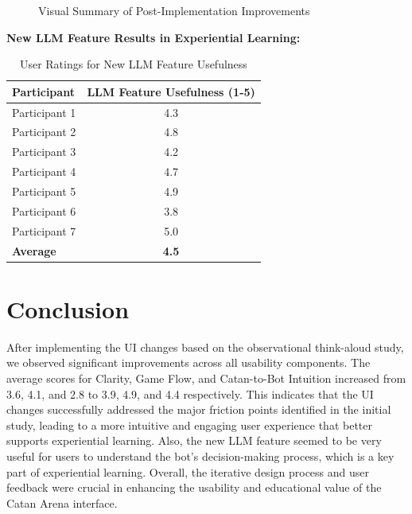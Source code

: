 \documentclass[12pt]{article}
\begin{document}
    \begin{figure}[H]
    \centering
    \caption{Visual Summary of Post-Implementation Improvements}
    \end{figure}


\textbf {New LLM Feature Results in Experiential Learning:}
\begin{table}[H]
    \centering
    \small
    \begin{tabular}{|l|c|}
    \hline
    \textbf{Participant} & \textbf{LLM Feature Usefulness (1-5)} \\ \hline
    Participant 1 & 4.3 \\ \hline 
    Participant 2 & 4.8 \\ \hline
    Participant 3 & 4.2 \\ \hline 
    Participant 4 & 4.7 \\ \hline 
    Participant 5 & 4.9 \\ \hline 
    Participant 6 & 3.8 \\ \hline 
    Participant 7 & 5.0 \\ \hline 
    \rowcolor[HTML]{F2F2F2} 
    \textbf{Average} & \textbf{4.5} \\ \hline
    \end{tabular}
    \caption{User Ratings for New LLM Feature Usefulness}
\end{table}

\section{Conclusion}

After implementing the UI changes based on the observational think-aloud study, we observed significant improvements across all usability components.
The average scores for Clarity, Game Flow, and Catan-to-Bot Intuition increased from 3.6, 4.1, and 2.8 to 3.9, 4.9, and 4.4 respectively.
This indicates that the UI changes successfully addressed the major friction points identified in the initial study,
leading to a more intuitive and engaging user experience that better supports experiential learning.
Also, the new LLM feature seemed to be very useful for users to understand the bot's decision-making process,
which is a key part of experiential learning.
Overall, the iterative design process and user feedback were crucial in enhancing the usability and educational value of the Catan Arena interface.
\end{document}
